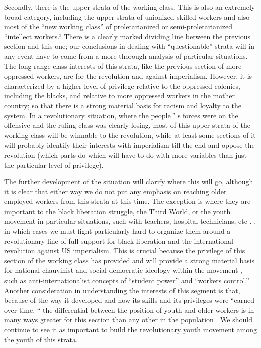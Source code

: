 \documentclass[12pt, titlepage]{article}
\begin{document}
{\begin{spacing}{1.10}
Secondly, there is the upper strata of the working class. This is also an extremely broad category, including the upper strata of unionized skilled workers and also most of the ``new working class'' of proletarianized or semi-proletarianized ``intellect workers.`` There is a clearly marked dividing line between the previous section and this one; our conclusions in dealing with ``questionable'' strata will in any event have to come from a more thorough analysis of particular situations. The long-range class interests of this strata, like the previous section of more oppressed workers, are for the revolution and against imperialism. However, it is characterized by a higher level of privilege relative to the oppressed colonies, including the blacks, and relative to more oppressed workers in the mother country; so that there is a strong material basis for racism and loyalty to the system. In a revolutionary situation, where the people ' s forces were on the offensive and the ruling class was clearly losing, most of this upper strata of the working class will be winnable to the revolution, while at least some sections of it will probably identify their interests with imperialism till the end and oppose the revolution (which parts do which will have to do with more variables than just the particular level of privilege).

The further development of the situation will clarify where this will go, although it is clear that either way we do not put any emphasis on reaching older employed workers from this strata at this time. The exception is where they are important to the black liberation struggle, the Third World, or the youth movement in particular situations, such with teachers, hospital technicians, etc . , in which cases we must fight particularly hard to organize them around a revolutionary line of full support for black liberation and the international revolution against US imperialism. This is crucial because the privilege of this section of the working class has provided and will provide a strong material basis for national chauvinist and social democratic ideology within the movement , such as anti-internationalist concepts of ``student power'' and ``workers control.'' Another consideration in understanding the interests of this segment is that, because of the way it developed and how its skills and its privileges were ``earned over time, `` the differential between the position of youth and older workers is in many ways greater for this section than any other in the population . We should continue to see it as important to build the revolutionary youth movement among the youth of this strata.


\end{spacing}}
\end{document}

